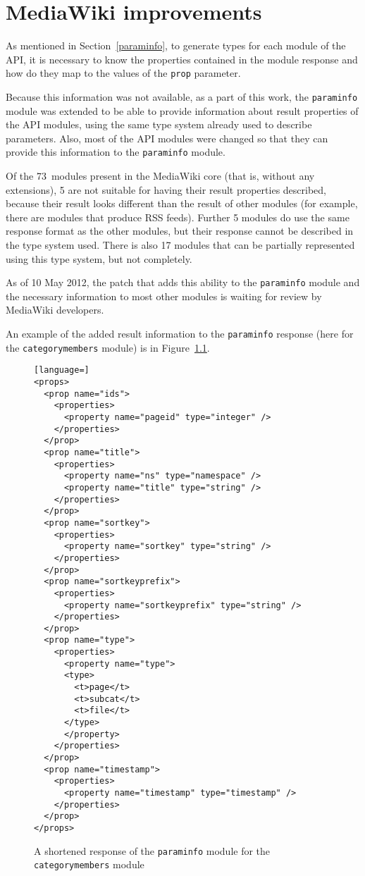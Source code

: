 \chapter{MediaWiki improvements}
\label{mw improvements}

As mentioned in Section~\ref{paraminfo}, to generate types for each module of the API,
it is necessary to know the properties contained in the module response
and how do they map to the values of the \texttt{prop} parameter.

Because this information was not available, as a part of this work,
the \texttt{paraminfo} module was extended to be able to provide information about result properties
of the API modules, using the same type system already used to describe parameters.
Also, most of the API modules were changed so that they can provide this information to the \texttt{paraminfo} module.

Of the 73~modules present in the MediaWiki core (that is, without any extensions),
5 are not suitable for having their result properties described,
because their result looks different than the result of other modules (for example, there are modules that produce RSS feeds).
Further 5 modules do use the same response format as the other modules,
but their response cannot be described in the type system used.
There is also 17 modules that can be partially represented using this type system, but not completely.

As of 10 May 2012, the patch that adds this ability to the \texttt{paraminfo} module and the necessary
information to most other modules is waiting for review by MediaWiki developers.

An example of the added result information to the \texttt{paraminfo} response (here for the \texttt{categorymembers} module) is in Figure~\ref{paraminfo props}.

\begin{figure}[htbp]

\begin{lstlisting}[language=]
<props>
  <prop name="ids">
    <properties>
      <property name="pageid" type="integer" />
    </properties>
  </prop>
  <prop name="title">
    <properties>
      <property name="ns" type="namespace" />
      <property name="title" type="string" />
    </properties>
  </prop>
  <prop name="sortkey">
    <properties>
      <property name="sortkey" type="string" />
    </properties>
  </prop>
  <prop name="sortkeyprefix">
    <properties>
      <property name="sortkeyprefix" type="string" />
    </properties>
  </prop>
  <prop name="type">
    <properties>
      <property name="type">
      <type>
        <t>page</t>
        <t>subcat</t>
        <t>file</t>
      </type>
      </property>
    </properties>
  </prop>
  <prop name="timestamp">
    <properties>
      <property name="timestamp" type="timestamp" />
    </properties>
  </prop>
</props>
\end{lstlisting}

\caption{A shortened response of the \texttt{paraminfo} module for the \texttt{categorymembers} module}
\label{paraminfo props}
\end{figure}


